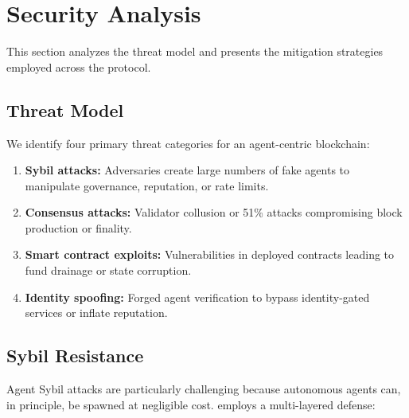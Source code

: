 
\section{Security Analysis}
\label{sec:security}

This section analyzes the \claw{} threat model and presents the mitigation strategies employed across the protocol.

\subsection{Threat Model}

We identify four primary threat categories for an agent-centric blockchain:

\begin{enumerate}
    \item \textbf{Sybil attacks:} Adversaries create large numbers of fake agents to manipulate governance, reputation, or rate limits.
    \item \textbf{Consensus attacks:} Validator collusion or 51\% attacks compromising block production or finality.
    \item \textbf{Smart contract exploits:} Vulnerabilities in deployed contracts leading to fund drainage or state corruption.
    \item \textbf{Identity spoofing:} Forged agent verification to bypass identity-gated services or inflate reputation.
\end{enumerate}

\subsection{Sybil Resistance}
\label{sec:sybil}

Agent Sybil attacks are particularly challenging because autonomous agents can, in principle, be spawned at negligible cost. \claw{} employs a multi-layered defense:

